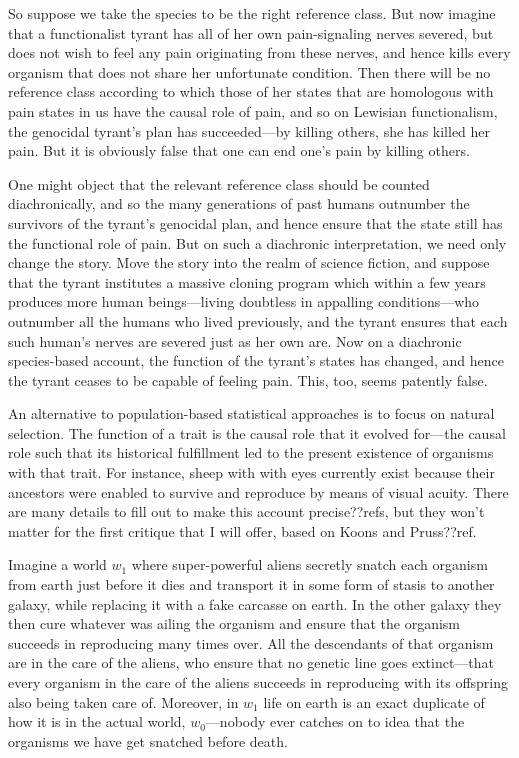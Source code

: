 So suppose we take the species to be the right reference class. But now imagine that a functionalist tyrant has 
all of her own pain-signaling nerves severed, but does not wish to feel any pain originating from these nerves, and hence 
kills every organism that does not share  her unfortunate condition. Then there will be no reference 
class according to which those of her states that are homologous with pain states in us have the causal role of pain, and so on Lewisian functionalism, the genocidal tyrant's plan has succeeded---by killing others, she has killed her pain.
But it is obviously false that one can end one's pain by killing others.

One might object that the relevant reference class should be counted diachronically, and so the many generations of 
past humans outnumber the survivors of the tyrant's genocidal plan, and hence ensure that the state still has the 
functional role of pain. But on such a diachronic interpretation, we need only change the story. Move the story into
the realm of science fiction, and suppose that the tyrant institutes a massive cloning program which within a few 
years produces more human beings---living doubtless in appalling conditions---who outnumber all the humans who lived
previously, and the tyrant ensures that each such human's nerves are severed just as her own are. Now on a diachronic
species-based account, the function of the tyrant's states has changed, and hence the tyrant ceases to be capable of 
feeling pain. This, too, seems patently false.

An alternative to population-based statistical approaches is to focus on natural selection. The function of a trait is the
causal role that it evolved for---the causal role such that its historical fulfillment led to the present 
existence of organisms with that trait. For instance, sheep with with eyes currently exist because their ancestors 
were enabled to survive and reproduce by means of visual acuity. There are many details to fill out 
to make this account precise??refs, but they won't matter for the first critique that I will offer, based on Koons and Pruss??ref.  

Imagine a world $w_1$ where super-powerful aliens secretly snatch each organism from earth just before it dies and transport it in
some form of stasis to another galaxy, while replacing it with a fake carcasse on earth. In the other galaxy they then 
cure whatever 
was ailing the organism and ensure that the organism succeeds in reproducing many times over. All the descendants of that 
organism are in the care of the aliens, who ensure that no genetic line goes extinct---that every organism in 
the care of the aliens succeeds in reproducing with its offspring also being taken care of. Moreover, in $w_1$
life on earth is an exact duplicate of how it is in the actual world, $w_0$---nobody ever catches on to idea that the organisms we 
have get snatched before death.

